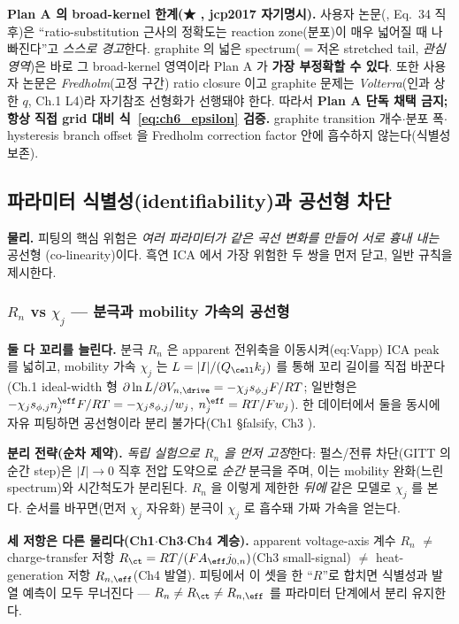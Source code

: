 \begin{boundbox}
\textbf{Plan A 의 broad-kernel 한계(★ , jcp2017 자기명시).} 사용자 논문(\cite{jcp2017}, Eq.~34 직후)은
``ratio-substitution 근사의 정확도는 reaction zone(분포)이 매우 넓어질 때 나빠진다''고 \emph{스스로 경고}한다.
graphite 의 넓은 spectrum($=$저온 stretched tail, \emph{관심 영역})은 바로 그 broad-kernel 영역이라 Plan A 가
\textbf{가장 부정확할 수 있다}. 또한 사용자 논문은 \emph{Fredholm}(고정 구간) ratio closure 이고 graphite 문제는
\emph{Volterra}(인과 상한 $q$, Ch.1 L4)라 자기참조 선형화가 선행돼야 한다. 따라서 \textbf{Plan A 단독 채택 금지;
항상 직접 grid 대비 식~\eqref{eq:ch6_epsilon} 검증.} graphite transition 개수$\cdot$분포 폭$\cdot$hysteresis branch
offset 을 Fredholm correction factor 안에 흡수하지 않는다(식별성 보존).
\end{boundbox}

\subsection{파라미터 식별성(identifiability)과 공선형 차단}\label{sec:ch6_identif}
\textbf{물리.} 피팅의 핵심 위험은 \emph{여러 파라미터가 같은 곡선 변화를 만들어 서로 흉내 내는} 공선형
(co-linearity)이다. 흑연 ICA 에서 가장 위험한 두 쌍을 먼저 닫고, 일반 규칙을 제시한다.

\subsubsection{$R_n$ vs $\chi_j$ — 분극과 mobility 가속의 공선형}\label{sec:ch6_RnChi}
\textbf{둘 다 꼬리를 늘린다.} 분극 $R_n$ 은 apparent 전위축을 이동시켜(eq:Vapp) ICA peak 를 넓히고, mobility 가속
$\chi_j$ 는 $L=|I|/(Q_\cell k_j)$ 를 통해 꼬리 길이를 직접 바꾼다(Ch.1 ideal-width 형
$\partial\ln L/\partial V_{n,\drive}=-\chi_j s_{\phi,j}F/RT$; 일반형은 $-\chi_j s_{\phi,j}n_j^{\eff}F/RT
=-\chi_j s_{\phi,j}/w_j$, $n_j^{\eff}=RT/Fw_j$). 한 데이터에서 둘을 동시에 자유 피팅하면 공선형이라 분리 불가다(Ch1 \S falsify, Ch3
).

\textbf{분리 전략(순차 제약).} \emph{독립 실험으로 $R_n$ 을 먼저 고정}한다: 펄스/전류 차단(GITT 의 순간 step)은
$|I|\to0$ 직후 전압 도약으로 \emph{순간} 분극을 주며, 이는 mobility 완화(느린 spectrum)와 시간척도가 분리된다.
$R_n$ 을 이렇게 제한한 \emph{뒤에} 같은 모델로 $\chi_j$ 를 본다. 순서를 바꾸면(먼저 $\chi_j$ 자유화) 분극이
$\chi_j$ 로 흡수돼 가짜 가속을 얻는다.
\begin{keybox}
\textbf{세 저항은 다른 물리다(Ch1$\cdot$Ch3$\cdot$Ch4 계승).} apparent voltage-axis 계수 $R_n$ $\ne$ charge-transfer
저항 $R_\ct=RT/(FA_\eff j_{0,n})$(Ch3 small-signal) $\ne$ heat-generation 저항 $R_{n,\eff}$(Ch4 발열). 피팅에서
이 셋을 한 ``$R$''로 합치면 식별성과 발열 예측이 모두 무너진다 — \textbf{$R_n\ne R_\ct\ne R_{n,\eff}$} 를
파라미터 단계에서 분리 유지한다.
\end{keybox}

